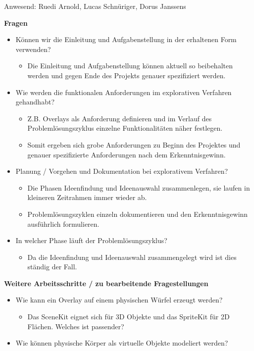 Anwesend: Ruedi Arnold, Lucas Schnüriger, Dorus Janssens

\textbf{Fragen}
\begin{itemize}
	\item Können wir die Einleitung und Aufgabenstellung in der erhaltenen Form verwenden?
	\begin{itemize}
		\item Die Einleitung und Aufgabenstellung können aktuell so beibehalten werden und gegen Ende des Projekts genauer spezifiziert werden.
	\end{itemize}
	\item Wie werden die funktionalen Anforderungen im explorativen Verfahren gehandhabt?
	\begin{itemize}
		\item Z.B. Overlays als Anforderung definieren und im Verlauf des Problemlösungszyklus einzelne Funktionalitäten näher festlegen.
		\item Somit ergeben sich grobe Anforderungen zu Beginn des Projektes und genauer spezifizierte Anforderungen nach dem Erkenntnisgewinn.
	\end{itemize}
	\item Planung / Vorgehen und Dokumentation bei explorativem Verfahren?
	\begin{itemize}
		\item Die Phasen Ideenfindung und Ideenauswahl zusammenlegen, sie laufen in kleineren Zeitrahmen immer wieder ab.
		\item Problemlösungszyklen einzeln dokumentieren und den Erkenntnisgewinn ausführlich formulieren.
	\end{itemize}
	\item In welcher Phase läuft der Problemlösungszyklus?
	\begin{itemize}
		\item Da die Ideenfindung und Ideenauswahl zusammengelegt wird ist dies ständig der Fall.
	\end{itemize}
\end{itemize}

\textbf{Weitere Arbeitsschritte / zu bearbeitende Fragestellungen}
\begin{itemize}
	\item Wie kann ein Overlay auf einem physischen Würfel erzeugt werden?
	\begin{itemize}
		\item Das SceneKit eignet sich für 3D Objekte und das SpriteKit für 2D Flächen. Welches ist passender?
	\end{itemize}
	\item Wie können physische Körper als virtuelle Objekte modeliert werden?
\end{itemize}

